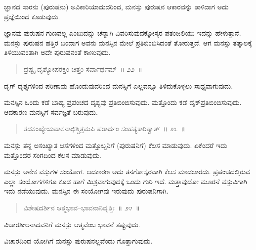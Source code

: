 \vspace{-0.3cm}

ಜ್ಞಾನದ ಸಾರನು (ಪುರುಷನು) ಅವಿಕಾರಿಯಾದುದರಿಂದ, ಮನಸ್ಸು ಪುರುಷನ ಆಕಾರವನ್ನು ತಾಳಿದಾಗ ಅದು ಪ್ರಜ್ಞೆಯಿಂದ ಕೂಡುವುದು. 

ಜ್ಞಾನವು ಪುರುಷನ ಗುಣವಲ್ಲ ಎಂಬುದನ್ನು ಚೆನ್ನಾಗಿ ವಿವರಿಸುವುದಕ್ಕೋಸ್ಕರ ಪತಂಜಲಿಯು ಇದನ್ನು ಹೇಳುತ್ತಾನೆ. ಮನಸ್ಸು ಪುರುಷನ ಹತ್ತಿರ ಬಂದಾಗ ಅವನು ಮನಸ್ಸಿನ ಮೇಲೆ ಪ್ರತಿಬಿಂಬಿಸಿದಂತೆ ತೋರುತ್ತದೆ. ಆಗ ಮನಸ್ಸು ತತ್ಕಾಲಕ್ಕೆ ತಿಳಿಯುವಂತಾಗಿ ಅದೇ ಪುರುಷನಂತೆ ಕಾಣುವುದು. 

\vspace{-0.3cm}

\begin{verse}
ದ್ರಷ್ಟೃ ದೃಶ್ಯೋಪರಕ್ತಂ ಚಿತ್ತಂ ಸರ್ವಾರ್ಥಮ್​~॥ ೨೨~॥
\end{verse}

\vspace{-0.3cm}

ದೃಗ್​ ದೃಶ್ಯಗಳಿಂದ ಪರಿಣಾಮ ಹೊಂದುವುದರಿಂದ ಮನಸ್ಸಿಗೆ ಎಲ್ಲವನ್ನೂ ತಿಳಿದುಕೊಳ್ಳಲು ಸಾಧ್ಯವಾಗುವುದು. 

ಮನಸ್ಸಿನ ಒಂದು ಕಡೆ ಬಾಹ್ಯ ಪ್ರಪಂಚದ ದೃಶ್ಯವು ಪ್ರತಿಬಿಂಬಿಸುವುದು. ಮತ್ತೊಂದು ಕಡೆ ದೃಕ್​ ಪ್ರತಿಬಿಂಬಿಸುವುದು. ಆದಕಾರಣ ಮನಸ್ಸಿಗೆ ಸರ್ವಜ್ಞತೆ ಬರುವುದು. 

\vspace{-0.3cm}

\begin{verse}
ತದಸಂಖ್ಯೇಯವಾಸನಾಭಿಶ್ಚಿತ್ರಮಪಿ ಪರಾರ್ಥಂ ಸಂಹತ್ಯಕಾರಿತ್ವಾತ್​~॥ ೨೩~॥
\end{verse}

\vspace{-0.3cm}

ಮನಸ್ಸು ತನ್ನ ಅಸಂಖ್ಯಾತ ಆಸೆಗಳಿಂದ ಮತ್ತೊಬ್ಬನಿಗೆ (ಪುರುಷನಿಗೆ) ಕೆಲಸ ಮಾಡುವುದು. ಏಕೆಂದರೆ ಇದು ಮತ್ತೊಂದರ ಸಂಗದಿಂದ ಕೆಲಸ ಮಾಡುವುದು. 

ಮನಸ್ಸು ಅನೇಕ ವಸ್ತುಗಳ ಸಂಯೋಗ. ಆದಕಾರಣ ಅದು ತನಗೋಸ್ಕರವಾಗಿ ಕೆಲಸ ಮಾಡಲಾರದು. ಪ್ರಪಂಚದಲ್ಲಿರುವ ಎಲ್ಲಾ ಸಂಯೋಗಗಳಿಗೂ ಕೂಡ ಹಾಗೆ ಮಿಶ್ರವಾಗುವುದಕ್ಕೆ ಒಂದು ಗುರಿ ಇದೆ. ಮತ್ತಾವುದೋ ಮೂರನೆ ವಸ್ತುವಿಗಾಗಿ ಇದು ನಡೆಯುವುದು. ಮನಸ್ಸಿನ ಈ ಸಂಯೋಗವು ಇರುವುದು ಪುರುಷನಿಗಾಗಿ. 

\vspace{-0.3cm}

\begin{verse}
ವಿಶೇಷದರ್ಶಿನ ಆತ್ಮಭಾವ–ಭಾವನಾನಿವೃತ್ತಿಃ~॥ ೨೪~॥
\end{verse}

\vspace{-0.3cm}

ವಿಚಾರಶೀಲನಾದವನಿಗೆ ಮನಸ್ಸು ಆತ್ಮವೆಂಬ ಭಾವನೆ ತಪ್ಪುವುದು. 

ವಿಚಾರದಿಂದ ಯೋಗಿಗೆ ಮನಸ್ಸು ಪುರುಷನಲ್ಲವೆಂದು ಗೊತ್ತಾಗುವುದು. 

\vspace{-0.3cm}

